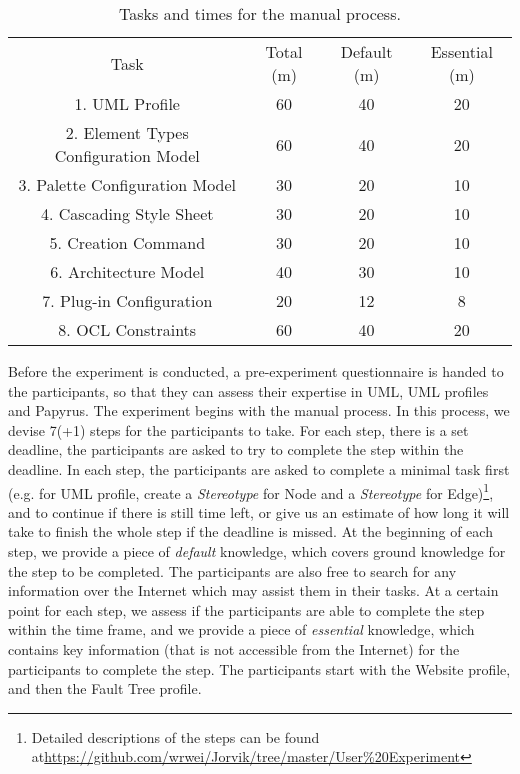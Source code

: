 \begin{table}[ht!]
	\centering
	\setlength{\tabcolsep}{3.5pt} 
	\begin{tabular}{|c|c|c|c|}
		Task & Total (m) & Default (m) & Essential (m) \\ 
		1. UML Profile & 60 & 40 & 20 \\
		2. Element Types Configuration Model & 60 & 40 & 20 \\
		3. Palette Configuration Model & 30 & 20 & 10 \\
		4. Cascading Style Sheet & 30 & 20 & 10 \\
		5. Creation Command & 30 & 20 & 10 \\
		6. Architecture Model & 40 & 30 & 10 \\
		7. Plug-in Configuration & 20 & 12 & 8 \\
		8. OCL Constraints & 60 & 40 & 20 \\
	\end{tabular}
	\label{tab:manual}
	\caption{Tasks and times for the manual process.}
\end{table}

Before the experiment is conducted, a pre-experiment questionnaire is handed to the participants, so that they can assess their expertise in UML, UML profiles and Papyrus.
The experiment begins with the manual process.
In this process, we devise 7(+1) steps for the participants to take.
For each step, there is a set deadline, the participants are asked to try to complete the step within the deadline.
In each step, the participants are asked to complete a minimal task first (e.g. for UML profile, create a \textit{Stereotype} for Node and a \textit{Stereotype} for Edge)\footnote{Detailed descriptions of the steps can be found at\url{https://github.com/wrwei/Jorvik/tree/master/User\%20Experiment}}, and to continue if there is still time left, or give us an estimate of how long it will take to finish the whole step if the deadline is missed.
At the beginning of each step, we provide a piece of \textit{default} knowledge, which covers ground knowledge for the step to be completed.
The participants are also free to search for any information over the Internet which may assist them in their tasks.
At a certain point for each step, we assess if the participants are able to complete the step within the time frame, and we provide a piece of \textit{essential} knowledge, which contains key information (that is not accessible from the Internet) for the participants to complete the step.
The participants start with the Website profile, and then the Fault Tree profile.

